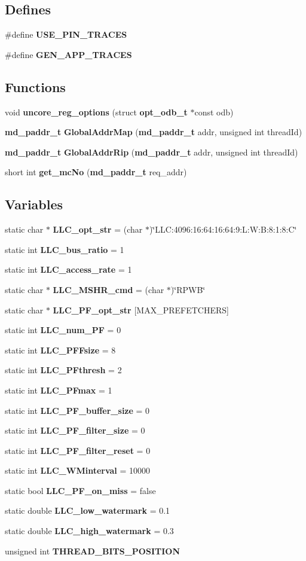 \subsection*{Defines}
\begin{CompactItemize}
\item 
\#define {\bf USE\_\-PIN\_\-TRACES}
\item 
\#define {\bf GEN\_\-APP\_\-TRACES}
\end{CompactItemize}
\subsection*{Functions}
\begin{CompactItemize}
\item 
void {\bf uncore\_\-reg\_\-options} (struct {\bf opt\_\-odb\_\-t} $\ast$const odb)
\item 
{\bf md\_\-paddr\_\-t} {\bf GlobalAddrMap} ({\bf md\_\-paddr\_\-t} addr, unsigned int threadId)
\item 
{\bf md\_\-paddr\_\-t} {\bf GlobalAddrRip} ({\bf md\_\-paddr\_\-t} addr, unsigned int threadId)
\item 
short int {\bf get\_\-mcNo} ({\bf md\_\-paddr\_\-t} req\_\-addr)
\end{CompactItemize}
\subsection*{Variables}
\begin{CompactItemize}
\item 
static char $\ast$ {\bf LLC\_\-opt\_\-str} = (char $\ast$)\char`\"{}LLC:4096:16:64:16:64:9:L:W:B:8:1:8:C\char`\"{}
\item 
static int {\bf LLC\_\-bus\_\-ratio} = 1
\item 
static int {\bf LLC\_\-access\_\-rate} = 1
\item 
static char $\ast$ {\bf LLC\_\-MSHR\_\-cmd} = (char $\ast$)\char`\"{}RPWB\char`\"{}
\item 
static char $\ast$ {\bf LLC\_\-PF\_\-opt\_\-str} [MAX\_\-PREFETCHERS]
\item 
static int {\bf LLC\_\-num\_\-PF} = 0
\item 
static int {\bf LLC\_\-PFFsize} = 8
\item 
static int {\bf LLC\_\-PFthresh} = 2
\item 
static int {\bf LLC\_\-PFmax} = 1
\item 
static int {\bf LLC\_\-PF\_\-buffer\_\-size} = 0
\item 
static int {\bf LLC\_\-PF\_\-filter\_\-size} = 0
\item 
static int {\bf LLC\_\-PF\_\-filter\_\-reset} = 0
\item 
static int {\bf LLC\_\-WMinterval} = 10000
\item 
static bool {\bf LLC\_\-PF\_\-on\_\-miss} = false
\item 
static double {\bf LLC\_\-low\_\-watermark} = 0.1
\item 
static double {\bf LLC\_\-high\_\-watermark} = 0.3
\item 
unsigned int {\bf THREAD\_\-BITS\_\-POSITION}
\end{CompactItemize}


